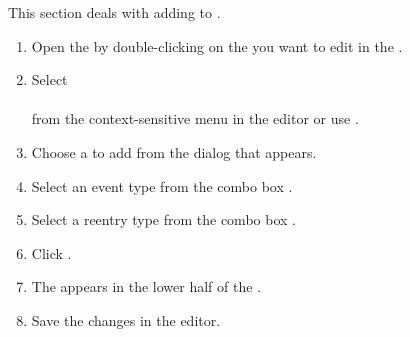 


This section deals with adding \gdehandlers{} to \gdcases{}.

\begin{enumerate}
\item Open the \gdtestcaseeditor{} by double-clicking on the \gdcase{} you want to edit in the \gdtestcasebrowser{}.   
\item Select\\
 \\from the context-sensitive menu in the editor or use . 


\item Choose a \gdcase{} to add from the dialog that appears.
\item Select an event type from the combo box .
\item Select a reentry type from the combo box . 
\item Click . 
\item The \gdehandler{} appears in the lower half of the \gdtestcaseeditor{}. 
\item Save the changes in the editor.
\end{enumerate}

